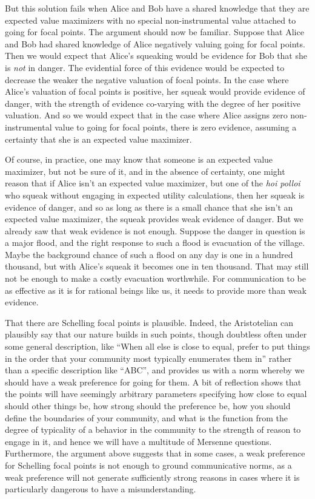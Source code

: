 But this solution fails when Alice and Bob have a shared knowledge that they are expected value maximizers
with no special non-instrumental value attached to going for focal points. The argument should now be familiar.
Suppose that Alice and Bob had shared knowledge of Alice negatively valuing going for focal points. Then we
would expect that Alice's squeaking would be evidence for Bob that she is \textit{not} in danger. The evidential
force of this evidence would be expected to decrease the weaker the negative valuation of focal points.
In the case where Alice's valuation of focal points is positive, her squeak would provide evidence of danger,
with the strength of evidence co-varying with the degree of her positive valuation. And so we would expect
that in the case where Alice assigns zero non-instrumental value to going for focal points, there is zero evidence,
assuming a certainty that she is an expected value maximizer.

Of course, in practice, one may know that someone is an expected value maximizer, but not be sure of it, and in
the absence of certainty, one might reason that if Alice isn't an expected value maximizer, but one of the
\textit{hoi polloi} who squeak without engaging in expected utility calculations, then her squeak is 
evidence of danger, and so as long as there is a small chance that she isn't an expected value maximizer,
the squeak provides weak evidence of danger. But we already saw that weak evidence is not enough. 
Suppose the danger in question is a major 
flood, and the right response to such a flood is evacuation of the village. Maybe the background chance of such a
flood on any day is one in a hundred thousand, but with Alice's squeak it becomes one in ten thousand. That may
still not be enough to make a costly evacuation worthwhile. For communication to be as effective as it is for rational
beings like us, it needs to provide more than weak evidence.

That there are Schelling focal points is plausible. Indeed, the Aristotelian can plausibly say that our
nature builds in such points, though doubtless often under some general description, like ``When all else is close to
equal, prefer to put
things in the order that your community most typically enumerates them in'' rather than a specific
description like ``ABC'', and provides us with a norm whereby we should have a weak preference for going
for them. A bit of reflection shows that the points will have seemingly arbitrary parameters specifying how close to
equal should other things be, how strong should the preference be, how you should define the boundaries of your
community, and what is the function from the degree of typicality of a behavior in the community to the strength of
reason to engage in it, and hence we will have a multitude of Mersenne questions. Furthermore, the argument above
suggests that in some cases, a weak preference for Schelling focal points is not enough to ground communicative
norms, as a weak preference will not generate sufficiently strong reasons in cases where it is particularly
dangerous to have a misunderstanding.

